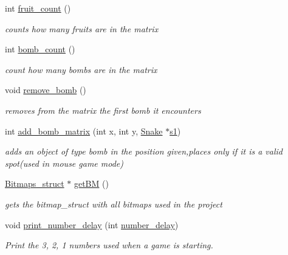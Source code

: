 \begin{DoxyCompactItemize}
int \hyperlink{group__graphics_ga387f95a1f4cb68e7b372ee62064d41a5}{fruit\+\_\+count} ()
\begin{DoxyCompactList}\small\item\em counts how many fruits are in the matrix \end{DoxyCompactList}\item 
int \hyperlink{group__graphics_gaec6c3092de0056a44586f7df6de16282}{bomb\+\_\+count} ()
\begin{DoxyCompactList}\small\item\em count how many bombs are in the matrix \end{DoxyCompactList}\item 
void \hyperlink{group__graphics_gacb3ed6bc6b07cdf572291ffcea76dab8}{remove\+\_\+bomb} ()
\begin{DoxyCompactList}\small\item\em removes from the matrix the first bomb it encounters \end{DoxyCompactList}\item 
int \hyperlink{group__graphics_ga4fa3e18d37f64de83f06af9aeb725ffd}{add\+\_\+bomb\+\_\+matrix} (int x, int y, \hyperlink{structSnake}{Snake} $\ast$\hyperlink{group__man__events_gaf79c0d77b0cca9ebf96bbbed1f88aed0}{s1})
\begin{DoxyCompactList}\small\item\em adds an object of type bomb in the position given,places only if it is a valid spot(used in mouse game mode) \end{DoxyCompactList}\item 
\hyperlink{structBitmaps__struct}{Bitmaps\+\_\+struct} $\ast$ \hyperlink{group__graphics_gaec3d602834e52141c736dcc41ef0ddc9}{get\+BM} ()
\begin{DoxyCompactList}\small\item\em gets the bitmap\+\_\+struct with all bitmaps used in the project \end{DoxyCompactList}\item 
void \hyperlink{group__graphics_gaf23c56c7e38458853c7a8775fb9e09ec}{print\+\_\+number\+\_\+delay} (int \hyperlink{group__man__events_ga49dac5534222e1641ae32eba8e7baf8e}{number\+\_\+delay})
\begin{DoxyCompactList}\small\item\em Print the 3, 2, 1 numbers used when a game is starting. \end{DoxyCompactList}\end{DoxyCompactItemize}

